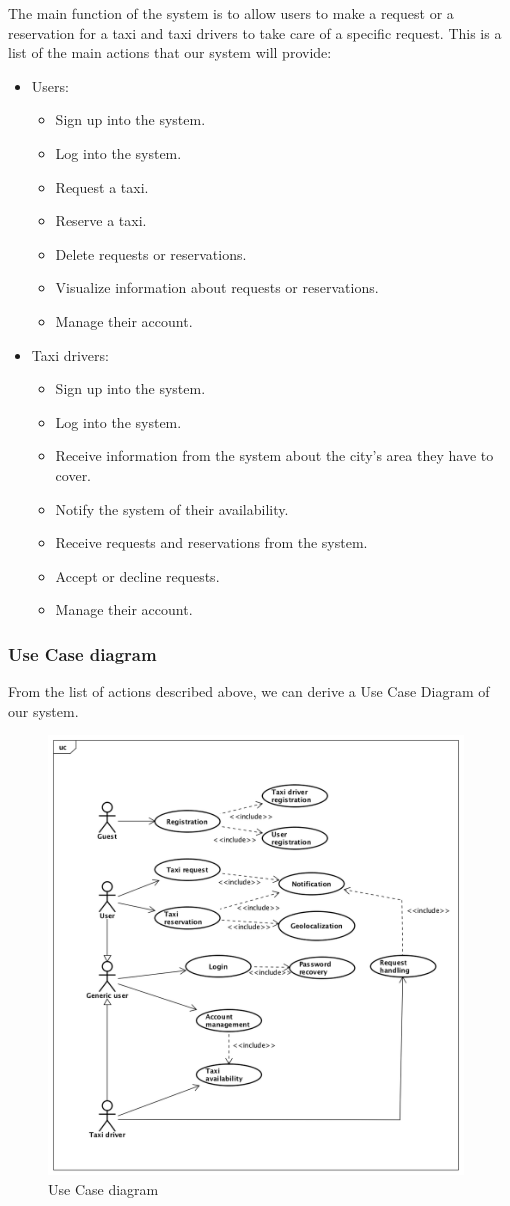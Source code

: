 The main function of the system is to allow users to make a request or a reservation for a taxi and taxi drivers to take care of a specific request.
This is a list of the main actions that our system will provide:

\begin{itemize}
    \item Users:
        \begin{itemize}
        	\item Sign up into the system.
        	\item Log into the system.
        	\item Request a taxi.
        	\item Reserve a taxi.
        	\item Delete requests or reservations.
        	\item Visualize information about requests or reservations.
        	\item Manage their account.
        \end{itemize}
    \item Taxi drivers:
        \begin{itemize}
        	\item Sign up into the system.
        	\item Log into the system.
        	\item Receive information from the system about the city's area they have to cover.
        	\item Notify the system of their availability.
        	\item Receive requests and reservations from the system.
        	\item Accept or decline requests.
        	\item Manage their account.
        \end{itemize}
\end{itemize}

\newpage
\subsubsection{Use Case diagram}
From the list of actions described above, we can derive a Use Case Diagram of our system.

\begin{figure}[h]
    \includegraphics[width=11cm]{./Diagrams/UseCaseDiagram.png}
    \caption{Use Case diagram}
    \centering
\end{figure}

 